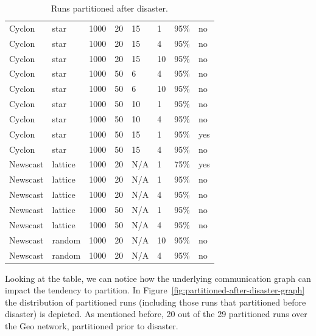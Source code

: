 \documentclass[a4paper]{ifacconf}
\begin{document}
\begin{table}
\begin{tabular}{llllllll}
        Cyclon & star & 1000 & 20 & 15 & 1 & 95\% & no \\
        Cyclon & star & 1000 & 20 & 15 & 4 & 95\% & no \\
        Cyclon & star & 1000 & 20 & 15 & 10 & 95\% & no \\
        Cyclon & star & 1000 & 50 & 6 & 4 & 95\% & no \\
        Cyclon & star & 1000 & 50 & 6 & 10 & 95\% & no \\
        Cyclon & star & 1000 & 50 & 10 & 1 & 95\% & no \\
        Cyclon & star & 1000 & 50 & 10 & 4 & 95\% & no \\
        Cyclon & star & 1000 & 50 & 15 & 1 & 95\% & yes \\
        Cyclon & star & 1000 & 50 & 15 & 4 & 95\% & no \\
        Newscast & lattice & 1000 & 20 & N/A & 1 & 75\% & yes \\
        Newscast & lattice & 1000 & 20 & N/A & 1 & 95\% & no \\
        Newscast & lattice & 1000 & 20 & N/A & 4 & 95\% & no \\
        Newscast & lattice & 1000 & 50 & N/A & 1 & 95\% & no \\
        Newscast & lattice & 1000 & 50 & N/A & 4 & 95\% & no \\
        Newscast & random & 1000 & 20 & N/A & 10 & 95\% & no \\
        Newscast & random & 1000 & 20 & N/A & 4 & 95\% & no \\
    \end{tabular}
    \caption{Runs partitioned after disaster.}
    \label{tab:partitioned-disaster}
\end{table}

Looking at the table, we can notice how the underlying communication graph can impact the tendency to partition.
In Figure~\ref{fig:partitioned-after-disaster-graph} the distribution of partitioned runs (including those runs that partitioned before disaster) is depicted.
As mentioned before, 20 out of the 29 partitioned runs over the Geo network, partitioned prior to disaster.
\end{document}
